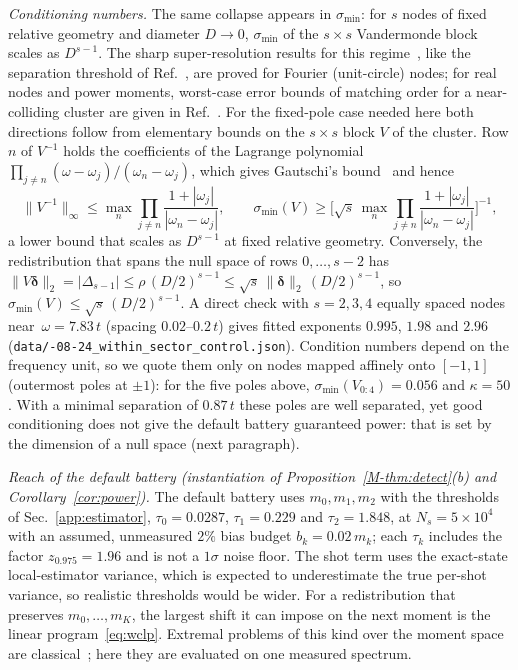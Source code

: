 \documentclass[aps,prb,onecolumn,superscriptaddress,longbibliography,floatfix]{revtex4-2}
\begin{document}
\emph{Conditioning numbers.} The same collapse appears in $\sigma_{\min}$: for $s$ nodes of fixed relative geometry and diameter $D\to0$, $\sigma_{\min}$ of the $s\times s$ Vandermonde block scales as $D^{s-1}$. The sharp super-resolution results for this regime~\cite{BatenkovClustered2020,KunisNagel2021,Donoho1992}, like the separation threshold of Ref.~\cite{Moitra2015}, are proved for Fourier (unit-circle) nodes; for real nodes and power moments, worst-case error bounds of matching order for a near-colliding cluster are given in Ref.~\cite{AkinshinGoldmanYomdin2021}. For the fixed-pole case needed here both directions follow from elementary bounds on the $s\times s$ block $V$ of the cluster. Row $n$ of $V^{-1}$ holds the coefficients of the Lagrange polynomial $\prod_{j\ne n}(\omega-\omega_j)/(\omega_n-\omega_j)$, which gives Gautschi's bound~\cite{Gautschi1962,Gautschi1963} and hence
\[
\|V^{-1}\|_\infty\le\max_n\prod_{j\ne n}\frac{1+|\omega_j|}{|\omega_n-\omega_j|},\qquad
\sigma_{\min}(V)\ge\Big[\sqrt{s}\,\max_n\prod_{j\ne n}\frac{1+|\omega_j|}{|\omega_n-\omega_j|}\Big]^{-1},
\]
a lower bound that scales as $D^{s-1}$ at fixed relative geometry. Conversely, the redistribution that spans the null space of rows $0,\dots,s-2$ has $\|V\bm{\delta}\|_2=|\Delta_{s-1}|\le\rho\,(D/2)^{s-1}\le\sqrt{s}\,\|\bm{\delta}\|_2\,(D/2)^{s-1}$, so $\sigma_{\min}(V)\le\sqrt{s}\,(D/2)^{s-1}$. A direct check with $s=2,3,4$ equally spaced nodes near~${\omega=7.83\,t}$ (spacing $0.02$--$0.2\,t$) gives fitted exponents $0.995$, $1.98$ and $2.96$ (\texttt{data/-08-24\_within\_sector\_control.json}). Condition numbers depend on the frequency unit, so we quote them only on nodes mapped affinely onto $[-1,1]$ (outermost poles at $\pm1$): for the five poles above, $\sigma_{\min}(V_{0:4})=0.056$ and $\kappa=50$. With a minimal separation of $0.87\,t$ these poles are well separated, yet good conditioning does not give the default battery guaranteed power: that is set by the dimension of a null space (next paragraph).

\emph{Reach of the default battery (instantiation of Proposition~\ref{M-thm:detect}(b) and Corollary~\ref{cor:power}).} The default battery uses $m_0,m_1,m_2$ with the thresholds of Sec.~\ref{app:estimator}, $\tau_0=0.0287$, $\tau_1=0.229$ and $\tau_2=1.848$, at $N_s=5\times10^4$ with an assumed, unmeasured $2\%$ bias budget $b_k=0.02\,m_k$; each $\tau_k$ includes the factor $z_{0.975}=1.96$ and is not a $1\sigma$ noise floor. The shot term uses the exact-state local-estimator variance, which is expected to underestimate the true per-shot variance, so realistic thresholds would be wider. For a redistribution that preserves $m_0,\dots,m_K$, the largest shift it can impose on the next moment is the linear program~\eqref{eq:wclp}. Extremal problems of this kind over the moment space are classical~\cite{KarlinStudden1966,KreinNudelman1977}; here they are evaluated on one measured spectrum.
\end{document}
